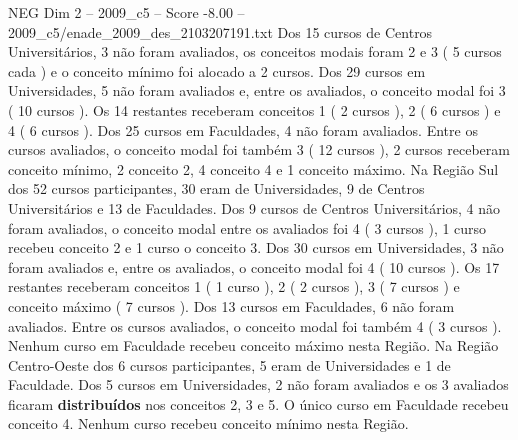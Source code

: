 \begin{textsample}{NEG Dim 2 – 2009\_c5 – Score -8.00 – 2009\_c5/enade\_2009\_des\_2103207191.txt}
Dos 15 cursos de Centros Universitários, 3 não foram avaliados, os conceitos modais foram 2 e 3 ( 5 cursos cada ) e o conceito mínimo foi alocado a 2 cursos.
Dos 29 cursos em Universidades, 5 não foram avaliados e, entre os avaliados, o conceito modal foi 3 ( 10 cursos ).
Os 14 restantes receberam conceitos 1 ( 2 cursos ), 2 ( 6 cursos ) e 4 ( 6 cursos ).
Dos 25 cursos em Faculdades, 4 não foram avaliados.
Entre os cursos avaliados, o conceito modal foi também 3 ( 12 cursos ), 2 cursos receberam conceito mínimo, 2 conceito 2, 4 conceito 4 e 1 conceito máximo.
Na Região Sul dos 52 cursos participantes, 30 eram de Universidades, 9 de Centros Universitários e 13 de Faculdades.
Dos 9 cursos de Centros Universitários, 4 não foram avaliados, o conceito modal entre os avaliados foi 4 ( 3 cursos ), 1 curso recebeu conceito 2 e 1 curso o conceito 3.
Dos 30 cursos em Universidades, 3 não foram avaliados e, entre os avaliados, o conceito modal foi 4 ( 10 cursos ).
Os 17 restantes receberam conceitos 1 ( 1 curso ), 2 ( 2 cursos ), 3 ( 7 cursos ) e conceito máximo ( 7 cursos ).
Dos 13 cursos em Faculdades, 6 não foram avaliados.
Entre os cursos avaliados, o conceito modal foi também 4 ( 3 cursos ).
Nenhum curso em Faculdade recebeu conceito máximo nesta Região.
Na Região Centro-Oeste dos 6 cursos participantes, 5 eram de Universidades e 1 de Faculdade.
Dos 5 cursos em Universidades, 2 não foram avaliados e os 3 avaliados ficaram \textbf{distribuídos} nos conceitos 2, 3 e 5.
O único curso em Faculdade recebeu conceito 4.
Nenhum curso recebeu conceito mínimo nesta Região.

\end{textsample}
